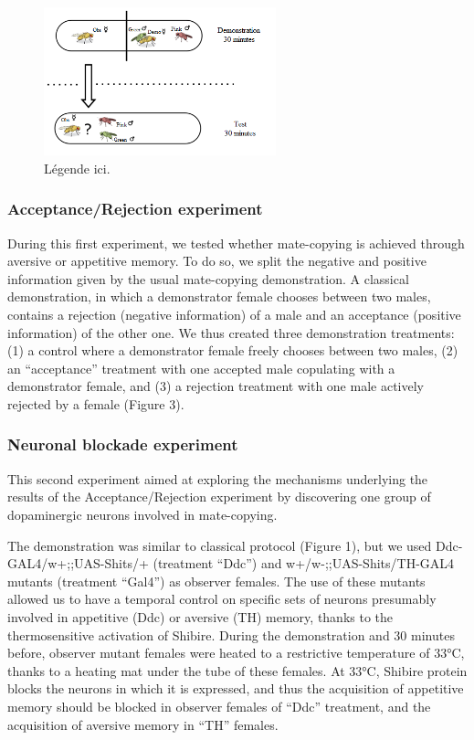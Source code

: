 \documentclass[a4paper, 12pt]{article}
\begin{document}
	\begin{figure}
	\centering
	\includegraphics[width=0.6\textwidth]{images/classic}
	\caption{Légende ici.}
	\label{fig:Classic protocol}
	\end{figure}

	\subsubsection{Acceptance/Rejection experiment}
	
	During this first experiment, we tested whether mate-copying is achieved through aversive or appetitive memory. To do so, we split the negative and positive information given by the usual mate-copying demonstration. A classical demonstration, in which a demonstrator female chooses between two males, contains a rejection (negative information) of a male and an acceptance (positive information) of the other one. We thus created three demonstration treatments: (1) a control where a demonstrator female freely chooses between two males, (2) an “acceptance” treatment with one accepted male copulating with a demonstrator female, and (3) a rejection treatment with one male actively rejected by a female (Figure 3).
	
	\subsubsection{Neuronal blockade experiment}
	
	This second experiment aimed at exploring the mechanisms underlying the results of the Acceptance/Rejection experiment by discovering one group of dopaminergic neurons involved in mate-copying.
	
	The demonstration was similar to classical protocol (Figure 1), but we used Ddc-GAL4/w+;;UAS-Shits/+ (treatment “Ddc”) and w+/w-;;UAS-Shits/TH-GAL4 mutants (treatment “Gal4”) as observer females. The use of these mutants allowed us to have a temporal control on specific sets of neurons presumably involved in appetitive (Ddc) or aversive (TH) memory, thanks to the thermosensitive activation of Shibire. During the demonstration and 30 minutes before, observer mutant females were heated to a restrictive temperature of 33°C, thanks to a heating mat under the tube of these females. At 33°C, Shibire protein blocks the neurons in which it is expressed, and thus the acquisition of appetitive memory should be blocked in observer females of “Ddc” treatment, and the acquisition of aversive memory in “TH” females. 
	
\end{document}
